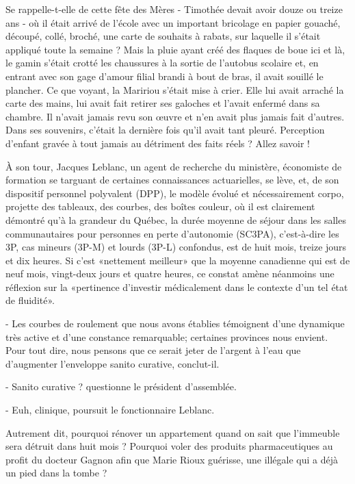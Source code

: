 Se rappelle-t-elle de cette fête des Mères - Timothée devait avoir douze ou treize ans - où il était arrivé de l’école avec un important bricolage en papier gouaché, découpé, collé, broché, une carte de souhaits à rabats, sur laquelle il s’était appliqué toute la semaine ? Mais la pluie ayant créé des flaques de boue ici et là, le gamin s’était crotté les chaussures à la sortie de l’autobus scolaire et, en entrant avec son gage d’amour filial brandi à bout de bras, il avait souillé le plancher. Ce que voyant, la Maririou s’était mise à crier. Elle lui avait arraché la carte des mains, lui avait fait retirer ses galoches et l’avait enfermé dans sa chambre. Il n’avait jamais revu son œuvre et n’en avait plus jamais fait d’autres. Dans ses souvenirs, c’était la dernière fois qu’il avait tant pleuré. Perception d’enfant gravée à tout jamais au détriment des faits réels ? Allez savoir !

À son tour, Jacques Leblanc, un agent de recherche du ministère, économiste de formation se targuant de certaines connaissances actuarielles, se lève, et, de son dispositif personnel polyvalent (DPP), le modèle évolué et nécessairement corpo, projette des tableaux, des courbes, des boîtes couleur, où il est clairement démontré qu’à la grandeur du Québec, la durée moyenne de séjour dans les salles communautaires pour personnes en perte d’autonomie (SC3PA), c’est-à-dire les 3P, cas mineurs (3P-M) et lourds (3P-L) confondus, est de huit mois, treize jours et dix heures. Si c’est «nettement meilleur» que la moyenne canadienne qui est de neuf mois, vingt-deux jours et quatre heures, ce constat amène néanmoins une réflexion sur la «pertinence d’investir médicalement dans le contexte d’un tel état de fluidité».

- Les courbes de roulement que nous avons établies témoignent d’une dynamique très active et d’une constance remarquable; certaines provinces nous envient. Pour tout dire, nous pensons que ce serait jeter de l’argent à l’eau que d’augmenter l’enveloppe sanito curative, conclut-il.

- Sanito curative ? questionne le président d’assemblée.

- Euh, clinique, poursuit le fonctionnaire Leblanc.

Autrement dit, pourquoi rénover un appartement quand on sait que l’immeuble sera détruit dans huit mois ? Pourquoi voler des produits pharmaceutiques au profit du docteur Gagnon afin que Marie Rioux guérisse, une illégale qui a déjà un pied dans la tombe ?


